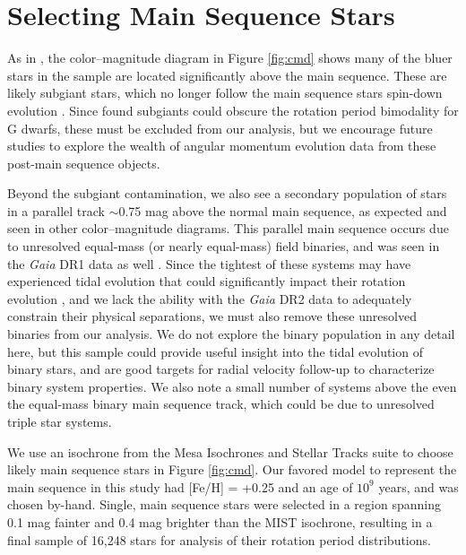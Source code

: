 \documentclass[preprint2]{aastex62}
\begin{document}
\section{Selecting Main Sequence Stars}

As in \citet{davenport2017}, the color--magnitude diagram in Figure \ref{fig:cmd} shows many of the bluer stars in the \citet{mcquillan2014} sample are located significantly above the main sequence. These are likely subgiant stars, which no longer follow the main sequence stars spin-down evolution \citep[e.g.][]{donascimento2012, van-saders2013}. Since \citet{davenport2017} found subgiants could obscure the rotation period bimodality for G dwarfs, these must be excluded from our analysis, but we encourage future studies to explore the wealth of angular momentum evolution data from these post-main sequence objects.

Beyond the subgiant contamination, we also see a secondary population of stars in a parallel track $\sim$0.75 mag above the normal main sequence, as expected and seen in other color--magnitude diagrams. This parallel main sequence occurs due to unresolved equal-mass (or nearly equal-mass) field binaries, and was seen in the {\em Gaia} DR1 data as well \citep{anderson2017}. Since the tightest of these systems may have experienced tidal evolution that could significantly impact their rotation evolution \citep[e.g.][]{lurie2017}, and we lack the ability with the {\em Gaia} DR2 data to adequately constrain their physical separations,
we must also remove these unresolved binaries from our analysis. We do not explore the binary population in any detail here, but this sample could provide useful insight into the tidal evolution of binary stars, and are good targets for radial velocity follow-up to characterize binary system properties. We also note a small number of systems above the even the equal-mass binary main sequence track, which could be due to unresolved triple star systems.

We use an isochrone from the Mesa Isochrones and Stellar Tracks suite \citep[MIST;][]{MIST} to choose likely main sequence stars in Figure \ref{fig:cmd}. Our favored model to represent the main sequence in this study had [Fe/H] = +0.25 and an age of $10^9$ years, and was chosen by-hand. Single, main sequence stars were selected in a region spanning 0.1 mag fainter and 0.4 mag brighter than the MIST isochrone, resulting in a final sample of 16,248 stars for analysis of their rotation period distributions.
\end{document}
